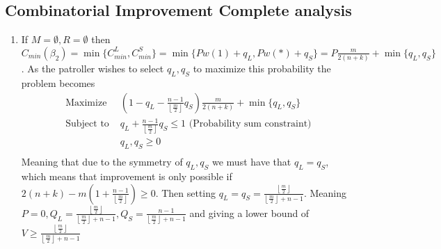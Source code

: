 \documentclass[a4paper,10pt]{article}
\newcommand{\floor}[1]{\left \lfloor #1 \right \rfloor}
\theoremstyle{definition}
\theoremstyle{definition}
\theoremstyle{remark}
\theoremstyle{definition}
\begin{document}
\subsection{Combinatorial Improvement Complete analysis}
\label{appendix:Choosinganalysis}
\begin{enumerate}
\item If $M= \emptyset , R= \emptyset$ then $C_{min} (\beta_{2})=\min \{ C_{min}^{L} , C_{min}^{S} \}= \min \{ Pw(1)+q_{L} , Pw(*)+q_{S} \}=P\frac{m}{2(n+k)} + \min \{ q_{L} , q_{S} \} $. As the patroller wishes to select $q_{L},q_{S}$ to maximize this probability the problem becomes
$$\begin{array}{cc}
\text{Maximize} &(1-q_{L}-\frac{n-1}{\floor{\frac{m}{2}}}q_{S}) \frac{m}{2(n+k)}+\min \{ q_{L}, q_{S}  \} \\
\text{Subject to } & q_{L}+\frac{n-1}{\floor{\frac{m}{2}}}q_{S} \leq 1 \text{  (Probability sum constraint)} \\
     & q_{L},q_{S} \geq 0 \\
\end{array} $$
Meaning that due to the symmetry of $q_{L},q_{S}$ we must have that $q_{L}=q_{S}$, which means that improvement is only possible if $2(n+k)- m(1+\frac{n-1}{\floor{\frac{m}{2}}}) \geq 0$. Then setting $q_{L}=q_{S}=\frac{\floor{\frac{m}{2}}}{\floor{\frac{m}{2}} +n-1}$. Meaning $P=0, Q_{L}=\frac{\floor{\frac{m}{2}}}{\floor{\frac{m}{2}} +n-1} , Q_{S}=\frac{n-1}{\floor{\frac{m}{2}} +n-1}$ and giving a lower bound of $V \geq \frac{\floor{\frac{m}{2}}}{\floor{\frac{m}{2}} +n-1}$


\end{enumerate}
\end{document}
